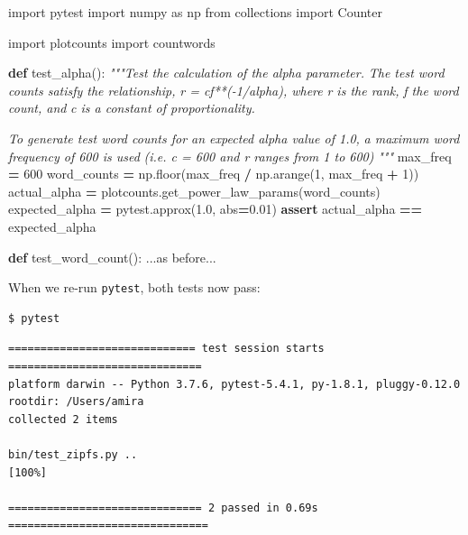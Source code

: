 \documentclass[
]{krantz}
\makeatletter
\newenvironment{Shaded}{\begin{snugshade}}{\end{snugshade}}
\newcommand{\BuiltInTok}[1]{#1}
\newcommand{\CommentTok}[1]{\textcolor[rgb]{0.56,0.35,0.01}{\textit{#1}}}
\newcommand{\ControlFlowTok}[1]{\textcolor[rgb]{0.13,0.29,0.53}{\textbf{#1}}}
\newcommand{\DecValTok}[1]{\textcolor[rgb]{0.00,0.00,0.81}{#1}}
\newcommand{\FloatTok}[1]{\textcolor[rgb]{0.00,0.00,0.81}{#1}}
\newcommand{\ImportTok}[1]{#1}
\newcommand{\KeywordTok}[1]{\textcolor[rgb]{0.13,0.29,0.53}{\textbf{#1}}}
\newcommand{\NormalTok}[1]{#1}
\newcommand{\OperatorTok}[1]{\textcolor[rgb]{0.81,0.36,0.00}{\textbf{#1}}}
\newenvironment{kframe}{%
\medskip{}
\setlength{\fboxsep}{.8em}
 \def\at@end@of@kframe{}%
 \ifinner\ifhmode%
  \def\at@end@of@kframe{\end{minipage}}%
  \begin{minipage}{\columnwidth}%
 \fi\fi%
 \def\FrameCommand##1{\hskip\@totalleftmargin \hskip-\fboxsep
 \colorbox{shadecolor}{##1}\hskip-\fboxsep
     \hskip-\linewidth \hskip-\@totalleftmargin \hskip\columnwidth}%
 \MakeFramed {\advance\hsize-\width
   \@totalleftmargin\z@ \linewidth\hsize
   \@setminipage}}%
 {\par\unskip\endMakeFramed%
 \at@end@of@kframe}
\renewenvironment{Shaded}{\begin{kframe}}{\end{kframe}}
\makeatother
\begin{document}
\begin{Shaded}
\begin{Highlighting}[]
\ImportTok{import}\NormalTok{ pytest}
\ImportTok{import}\NormalTok{ numpy }\ImportTok{as}\NormalTok{ np}
\ImportTok{from}\NormalTok{ collections }\ImportTok{import}\NormalTok{ Counter}

\ImportTok{import}\NormalTok{ plotcounts}
\ImportTok{import}\NormalTok{ countwords}

\KeywordTok{def}\NormalTok{ test\_alpha():}
    \CommentTok{"""Test the calculation of the alpha parameter.}
\CommentTok{    }
\CommentTok{    The test word counts satisfy the relationship,}
\CommentTok{      r = cf**({-}1/alpha), where}
\CommentTok{      r is the rank,}
\CommentTok{      f the word count, and}
\CommentTok{      c is a constant of proportionality.}

\CommentTok{    To generate test word counts for an expected alpha value of 1.0,}
\CommentTok{      a maximum word frequency of 600 is used}
\CommentTok{      (i.e. c = 600 and r ranges from 1 to 600)}
\CommentTok{    """}    
\NormalTok{    max\_freq }\OperatorTok{=} \DecValTok{600}
\NormalTok{    word\_counts }\OperatorTok{=}\NormalTok{ np.floor(max\_freq }\OperatorTok{/}\NormalTok{ np.arange(}\DecValTok{1}\NormalTok{, max\_freq }\OperatorTok{+} \DecValTok{1}\NormalTok{))}
\NormalTok{    actual\_alpha }\OperatorTok{=}\NormalTok{ plotcounts.get\_power\_law\_params(word\_counts)}
\NormalTok{    expected\_alpha }\OperatorTok{=}\NormalTok{ pytest.approx(}\FloatTok{1.0}\NormalTok{, }\BuiltInTok{abs}\OperatorTok{=}\FloatTok{0.01}\NormalTok{)}
    \ControlFlowTok{assert}\NormalTok{ actual\_alpha }\OperatorTok{==}\NormalTok{ expected\_alpha}

\KeywordTok{def}\NormalTok{ test\_word\_count():}
\NormalTok{    ...}\ImportTok{as}\NormalTok{ before...}
\end{Highlighting}
\end{Shaded}

When we re-run \texttt{pytest},
both tests now pass:

\begin{verbatim}
$ pytest
\end{verbatim}

\begin{verbatim}
============================= test session starts ==============================
platform darwin -- Python 3.7.6, pytest-5.4.1, py-1.8.1, pluggy-0.12.0
rootdir: /Users/amira
collected 2 items                                                              

bin/test_zipfs.py ..                                                     [100%]

============================== 2 passed in 0.69s ===============================
\end{verbatim}
\end{document}
